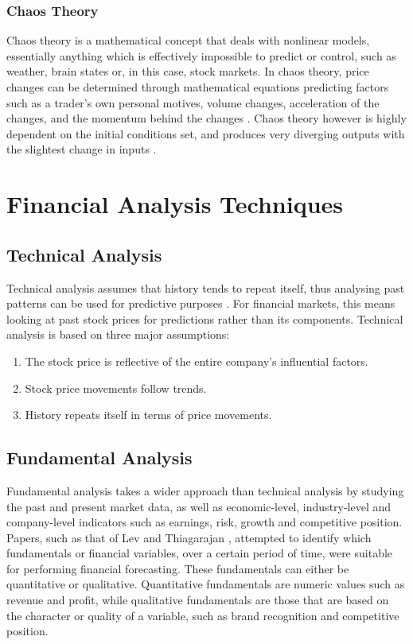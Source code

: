 \documentclass{UoYCSproject}
\begin{document}
\subsubsection{Chaos Theory}
Chaos theory is a mathematical concept that deals with nonlinear models, essentially anything which is effectively impossible to predict or control, such as weather, brain states or, in this case, stock markets. In chaos theory, price changes can be determined through mathematical equations predicting factors such as a trader's own personal motives, volume changes, acceleration of the changes, and the momentum behind the changes \cite{chaostheory}. Chaos theory however is highly dependent on the initial conditions set, and produces very diverging outputs with the slightest change in inputs \cite{kellert1993wake}. 

\section{Financial Analysis Techniques}
\subsection{Technical Analysis}
Technical analysis assumes that history tends to repeat itself, thus analysing past patterns can be used for predictive purposes \cite{levy1966conceptual}. For financial markets, this means looking at past stock prices for predictions rather than its components. Technical analysis is based on three major assumptions:
\begin{enumerate}
    \item The stock price is reflective of the entire company's influential factors.
    \item Stock price movements follow trends.
    \item History repeats itself in terms of price movements.
\end{enumerate}

\subsection{Fundamental Analysis}
Fundamental analysis takes a wider approach than technical analysis by studying the past and present market data, as well as economic-level, industry-level and company-level indicators such as earnings, risk, growth and competitive position. Papers, such as that of Lev and Thiagarajan \cite{lev1993fundamental}, attempted to identify which fundamentals or financial variables, over a certain period of time, were suitable for performing financial forecasting. These fundamentals can either be quantitative or qualitative. Quantitative fundamentals are numeric values such as revenue and profit, while qualitative fundamentals are those that are based on the character or quality of a variable, such as brand recognition and competitive position. 
\end{document}
